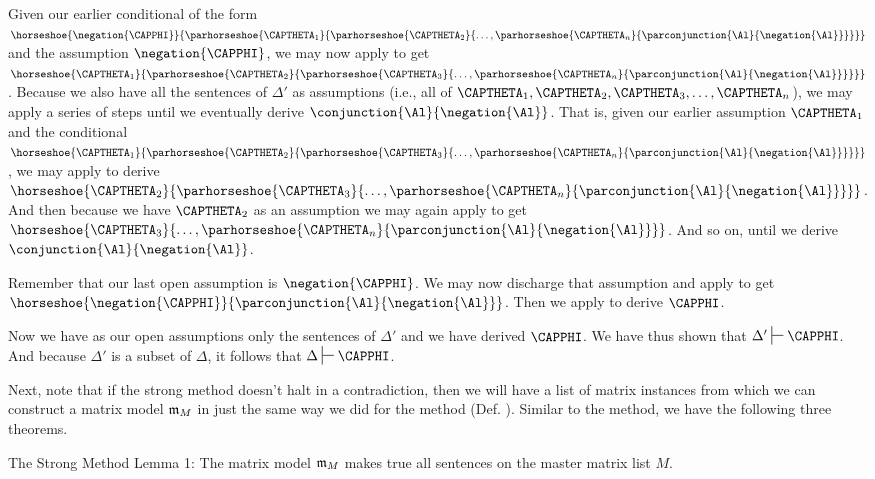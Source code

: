 \begin{PROOF}
Given our earlier conditional of the form $\horseshoe{\negation{\CAPPHI}}{\parhorseshoe{\CAPTHETA_1}{\parhorseshoe{\CAPTHETA_2}{\ldots, \parhorseshoe{\CAPTHETA_{\integer{n}}}{\parconjunction{\Al}{\negation{\Al}}}}}}$ and the assumption $\negation{\CAPPHI}$, we may now apply  to get $\horseshoe{\CAPTHETA_1}{\parhorseshoe{\CAPTHETA_2}{\parhorseshoe{\CAPTHETA_3}{\ldots, \parhorseshoe{\CAPTHETA_{\integer{n}}}{\parconjunction{\Al}{\negation{\Al}}}}}}$.  Because we also have all the sentences of $\Delta'$ as assumptions (i.e., all of $\CAPTHETA_1, \CAPTHETA_2, \CAPTHETA_3, \ldots, \CAPTHETA_{\integer{n}}$), we may apply a series of  steps until we eventually derive $\conjunction{\Al}{\negation{\Al}}$.  That is, given our earlier assumption $\CAPTHETA_1$ and the conditional $\horseshoe{\CAPTHETA_1}{\parhorseshoe{\CAPTHETA_2}{\parhorseshoe{\CAPTHETA_3}{\ldots, \parhorseshoe{\CAPTHETA_{\integer{n}}}{\parconjunction{\Al}{\negation{\Al}}}}}}$, we may apply  to derive $\horseshoe{\CAPTHETA_2}{\parhorseshoe{\CAPTHETA_3}{\ldots, \parhorseshoe{\CAPTHETA_{\integer{n}}}{\parconjunction{\Al}{\negation{\Al}}}}}$.  And then because we have $\CAPTHETA_2$ as an assumption we may again apply  to get $\horseshoe{\CAPTHETA_3}{\ldots, \parhorseshoe{\CAPTHETA_{\integer{n}}}{\parconjunction{\Al}{\negation{\Al}}}}$.  And so on, until we derive $\conjunction{\Al}{\negation{\Al}}$.

Remember that our last open assumption is $\negation{\CAPPHI}$.  We may now discharge that assumption and apply  to get $\horseshoe{\negation{\CAPPHI}}{\parconjunction{\Al}{\negation{\Al}}}$.  Then we apply  to derive $\CAPPHI$.

Now we have as our open assumptions only the sentences of $\Delta'$ and we have derived $\CAPPHI$.  We have thus shown that $\Delta'\sststile{}{}\CAPPHI$.  And because $\Delta'$ is a subset of $\Delta$, it follows that $\Delta\sststile{}{}\CAPPHI$.
\end{PROOF}
\noindent{}Next, note that if the strong method doesn't halt in a contradiction, then we will have a list of matrix instances from which we can construct a matrix model $\mathfrak{m}_M$ in just the same way we did for the method (Def. ).
Similar to the method, we have the following three theorems.
\begin{THEOREM}{ The Strong Method Lemma 1:}
The matrix model $\mathfrak{m}_M$ makes true all sentences on the master matrix list $M$.
\end{THEOREM}
